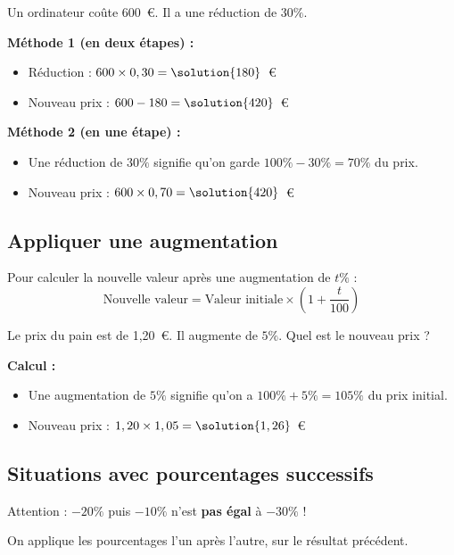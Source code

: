 \begin{examplebox}
	Un ordinateur coûte 600~€. Il a une réduction de $30\%$.

	\textbf{Méthode 1 (en deux étapes) :}
	\begin{itemize}
		\item Réduction : $600 \times 0,30 = \solution{180}$~€
		\item Nouveau prix : $600 - 180 = \solution{420}$~€
	\end{itemize}

	\textbf{Méthode 2 (en une étape) :}
	\begin{itemize}
		\item Une réduction de $30\%$ signifie qu'on garde $100\% - 30\% = 70\%$ du prix.
		\item Nouveau prix : $600 \times 0,70 = \solution{420}$~€
	\end{itemize}
\end{examplebox}

\subsection{Appliquer une augmentation}

\begin{methodebox}
	Pour calculer la nouvelle valeur après une augmentation de $t\%$ :
	$$\text{Nouvelle valeur} = \text{Valeur initiale} \times \left(1 + \dfrac{t}{100}\right)$$
\end{methodebox}

\begin{examplebox}
	Le prix du pain est de 1,20~€. Il augmente de $5\%$. Quel est le nouveau prix ?

	\textbf{Calcul :}
	\begin{itemize}
		\item Une augmentation de $5\%$ signifie qu'on a $100\% + 5\% = 105\%$ du prix initial.
		\item Nouveau prix : $1,20 \times 1,05 = \solution{1,26}$~€
	\end{itemize}
\end{examplebox}

\subsection{Situations avec pourcentages successifs}

\begin{remarkbox}
	Attention : $-20\%$ puis $-10\%$ n'est \textbf{pas égal} à $-30\%$ !

	On applique les pourcentages l'un après l'autre, sur le résultat précédent.
\end{remarkbox}

